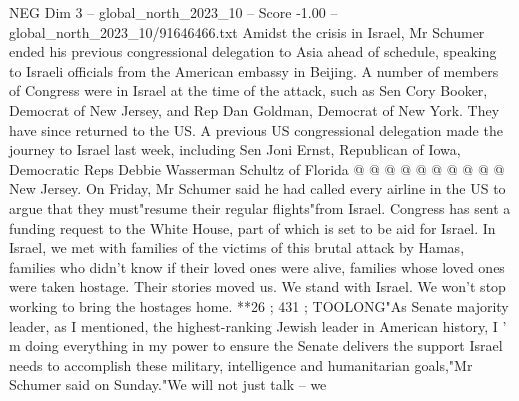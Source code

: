 \begin{textsample}{NEG Dim 3 – global\_north\_2023\_10 – Score -1.00 – global\_north\_2023\_10/91646466.txt}
Amidst the crisis in Israel, Mr Schumer ended his previous congressional delegation to Asia ahead of schedule, speaking to Israeli officials from the American embassy in Beijing.
A number of members of Congress were in Israel at the time of the attack, such as Sen Cory Booker, Democrat of New Jersey, and Rep Dan Goldman, Democrat of New York.
They have since returned to the US.
A previous US congressional delegation made the journey to Israel last week, including Sen Joni Ernst, Republican of Iowa, Democratic Reps Debbie Wasserman Schultz of Florida @ @ @ @ @ @ @ @ @ @ New Jersey.
On Friday, Mr Schumer said he had called every airline in the US to argue that they must"resume their regular flights"from Israel.
Congress has sent a funding request to the White House, part of which is set to be aid for Israel.
In Israel, we met with families of the victims of this brutal attack by Hamas, families who didn't know if their loved ones were alive, families whose loved ones were taken hostage.
Their stories moved us.
We stand with Israel.
We won't stop working to bring the hostages home. **26 ; 431 ; TOOLONG"As Senate majority leader, as I mentioned, the highest-ranking Jewish leader in American history, I ' m doing everything in my power to ensure the Senate delivers the support Israel needs to accomplish these military, intelligence and humanitarian goals,"Mr Schumer said on Sunday."We will not just talk -- we

\end{textsample}

